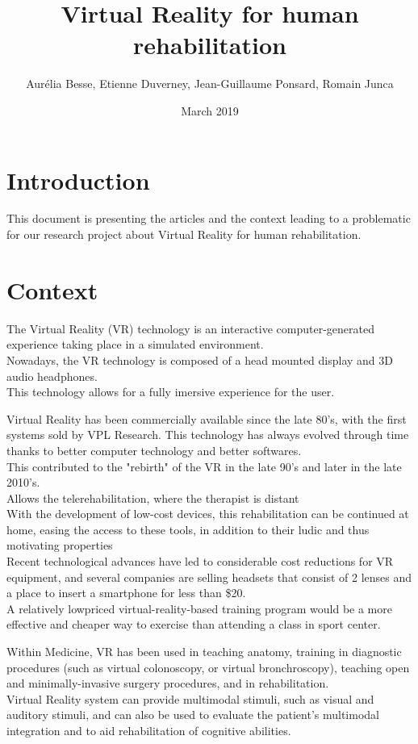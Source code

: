 \documentclass{article}
\title{Virtual Reality for human rehabilitation}
\author{ Aurélia Besse, Etienne Duverney, Jean-Guillaume Ponsard, Romain Junca }
\date{March 2019}
\begin{document}
\maketitle

\section{Introduction}

This document is presenting the articles and the context leading to a problematic for our research project about Virtual Reality for human rehabilitation.


\section{Context}

The Virtual Reality (VR) technology is an interactive computer-generated experience taking place in a simulated environment. 
\\
Nowadays, the VR technology is composed of a head mounted display and 3D audio headphones.
\\
This technology allows for a fully imersive experience for the user.

Virtual Reality has been commercially available since the late 80's, with the first systems sold by VPL Research.
This technology has always evolved through time thanks to better computer technology and better softwares.
\\
This contributed to the "rebirth" of the VR in the late 90's and later in the late 2010's.
\\

Allows the telerehabilitation, where the therapist is distant 
\\ With the development of low-cost devices, this rehabilitation can be continued at home, easing the access to these tools, in addition to their ludic and thus motivating properties
\\ Recent technological advances have led to considerable cost reductions for VR equipment, and several companies are selling headsets that consist of 2 lenses and a place to insert a smartphone for less than \$20.
\\ A relatively lowpriced virtual-reality-based training program would be a more effective and cheaper way to exercise than attending a class in sport center.

Within Medicine, VR has been used in teaching anatomy, training in diagnostic procedures (such as virtual colonoscopy, or virtual bronchroscopy), teaching open and minimally-invasive surgery procedures, and in rehabilitation. \\
Virtual Reality system can provide multimodal stimuli, such as visual and auditory stimuli, and can also be used to evaluate the patient’s multimodal integration and to aid rehabilitation of cognitive abilities. \\
\end{document}

